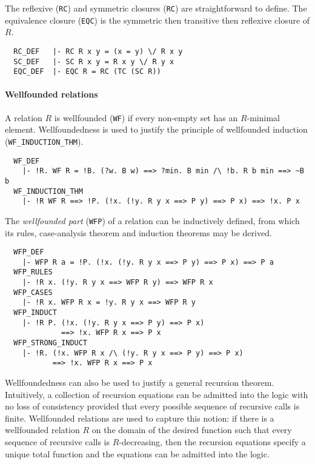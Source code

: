 \medskip

The reflexive ({\small\verb+RC+}) and symmetric closures
({\small\verb+RC+}) are straightforward to define. The equivalence
closure ({\small\verb+EQC+}) is the symmetric then transitive then
reflexive closure of $R$.
%
\begin{hol}
{\small
\begin{verbatim}
  RC_DEF   |- RC R x y = (x = y) \/ R x y
  SC_DEF   |- SC R x y = R x y \/ R y x
  EQC_DEF  |- EQC R = RC (TC (SC R))
\end{verbatim}}
\end{hol}

\paragraph {Wellfounded relations}

A relation $R$ is wellfounded ({\small\verb+WF+}) if every non-empty set
has an $R$-minimal element. Wellfoundedness is used to justify the
principle of wellfounded induction ({\small\verb+WF_INDUCTION_THM+}).
%
\begin{hol}
{\small
\begin{verbatim}
  WF_DEF
    |- !R. WF R = !B. (?w. B w) ==> ?min. B min /\ !b. R b min ==> ~B b
  WF_INDUCTION_THM
    |- !R WF R ==> !P. (!x. (!y. R y x ==> P y) ==> P x) ==> !x. P x
\end{verbatim}}
\end{hol}

The \emph{wellfounded part} ({\small\verb+WFP+}) of a relation can be
inductively defined, from which its rules, case-analysis theorem and
induction theorems may be derived.
%
\begin{hol}
{\small
\begin{verbatim}
  WFP_DEF
    |- WFP R a = !P. (!x. (!y. R y x ==> P y) ==> P x) ==> P a
  WFP_RULES
    |- !R x. (!y. R y x ==> WFP R y) ==> WFP R x
  WFP_CASES
    |- !R x. WFP R x = !y. R y x ==> WFP R y
  WFP_INDUCT
    |- !R P. (!x. (!y. R y x ==> P y) ==> P x)
             ==> !x. WFP R x ==> P x
  WFP_STRONG_INDUCT
    |- !R. (!x. WFP R x /\ (!y. R y x ==> P y) ==> P x)
           ==> !x. WFP R x ==> P x
\end{verbatim}}
\end{hol}

Wellfoundedness can also be used to justify a general recursion
theorem. Intuitively, a collection of recursion equations can be
admitted into the \HOL{} logic with no loss of consistency provided
that every possible sequence of recursive calls is finite. Wellfounded
relations are used to capture this notion: if there is a wellfounded
relation $R$ on the domain of the desired function such that every
sequence of recursive calls is $R$-decreasing, then the recursion
equations specify a unique total function and the equations can be
admitted into the logic.

